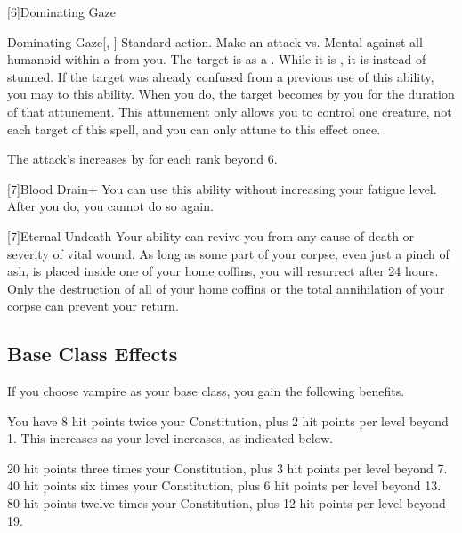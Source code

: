     [6]{Dominating Gaze}
      \begin{magicalactiveability}{Dominating Gaze}[, ]
        \abilityusagetime Standard action.
        \rankline
        Make an attack vs. Mental against all humanoid  within a \medarea {} from you.
        \hit The target is \stunned as a .
        While it is , it is \confused instead of stunned.
        \crit If the target was already confused from a previous use of this ability, you may  to this ability.
        When you do, the target becomes \dominated by you for the duration of that attunement.
        This attunement only allows you to control one creature, not each target of this spell, and you can only attune to this effect once.

        \rankline
        The attack's  increases by  for each rank beyond 6.
      \end{magicalactiveability}

    [7]{Blood Drain+} You can use this ability without increasing your fatigue level.
    After you do, you  cannot do so again.

    [7]{Eternal Undeath} Your  ability can revive you from any cause of death or severity of vital wound.
      As long as some part of your corpse, even just a pinch of ash, is placed inside one of your home coffins, you will resurrect after 24 hours.
      Only the destruction of all of your home coffins or the total annihilation of your corpse can prevent your return.

  \subsection{Base Class Effects}
    \highhpprogressiontable

    If you choose vampire as your base class, you gain the following benefits.

      You have 8 hit points \add twice your Constitution, plus 2 hit points per level beyond 1.
      This increases as your level increases, as indicated below.
      \begin{raggeditemize}
         20 hit points \add three times your Constitution, plus 3 hit points per level beyond 7.
         40 hit points \add six times your Constitution, plus 6 hit points per level beyond 13.
         80 hit points \add twelve times your Constitution, plus 12 hit points per level beyond 19.
      \end{raggeditemize}

